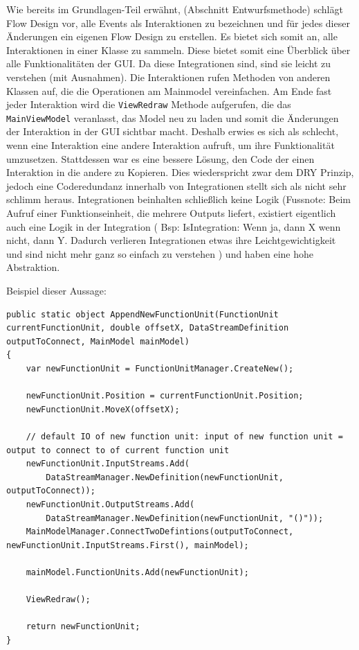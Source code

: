 Wie bereits im Grundlagen-Teil erwähnt, (Abschnitt Entwurfsmethode) schlägt Flow Design
vor, alle Events als Interaktionen zu bezeichnen und für jedes dieser
Änderungen ein eigenen Flow Design zu erstellen. 
Es bietet sich somit an, alle Interaktionen in einer Klasse zu sammeln.
Diese bietet somit eine Überblick über alle Funktionalitäten der GUI.
Da diese Integrationen sind, sind sie leicht zu verstehen (mit Ausnahmen). Die
Interaktionen rufen Methoden von anderen Klassen auf, die die Operationen am
Mainmodel vereinfachen. Am Ende fast jeder Interaktion wird die \texttt{ViewRedraw}
Methode aufgerufen, die das \texttt{MainViewModel} veranlasst, das Model neu zu
laden und somit die Änderungen der Interaktion in der GUI sichtbar macht.
Deshalb erwies es sich als schlecht, wenn eine Interaktion eine andere
Interaktion aufruft, um ihre Funktionalität umzusetzen. 
Stattdessen war es eine bessere Lösung, den Code der einen Interaktion in
die andere zu Kopieren. Dies wiederspricht zwar dem DRY Prinzip, jedoch eine
Coderedundanz innerhalb von Integrationen stellt sich als nicht sehr schlimm
heraus. Integrationen beinhalten schließlich keine Logik (Fussnote: Beim
Aufruf einer Funktionseinheit, die mehrere Outputs liefert, existiert
eigentlich auch eine Logik in der Integration ( Bsp: IsIntegration: Wenn ja,
dann X wenn nicht, dann Y. Dadurch verlieren Integrationen etwas ihre
Leichtgewichtigkeit und sind nicht mehr ganz so einfach zu verstehen ) und haben eine hohe
Abstraktion.

Beispiel dieser Aussage:
\begin{lstlisting}[caption=AppendNewFunctionUnit]
public static object AppendNewFunctionUnit(FunctionUnit currentFunctionUnit, double offsetX, DataStreamDefinition outputToConnect, MainModel mainModel)
{
	var newFunctionUnit = FunctionUnitManager.CreateNew();
	
	newFunctionUnit.Position = currentFunctionUnit.Position;
	newFunctionUnit.MoveX(offsetX);
	
	// default IO of new function unit: input of new function unit = output to connect to of current function unit
	newFunctionUnit.InputStreams.Add(
		DataStreamManager.NewDefinition(newFunctionUnit, outputToConnect));
	newFunctionUnit.OutputStreams.Add(
		DataStreamManager.NewDefinition(newFunctionUnit, "()"));
	MainModelManager.ConnectTwoDefintions(outputToConnect, newFunctionUnit.InputStreams.First(), mainModel);
	
	mainModel.FunctionUnits.Add(newFunctionUnit);
	
	ViewRedraw();
	
	return newFunctionUnit;
}
\end{lstlisting}

